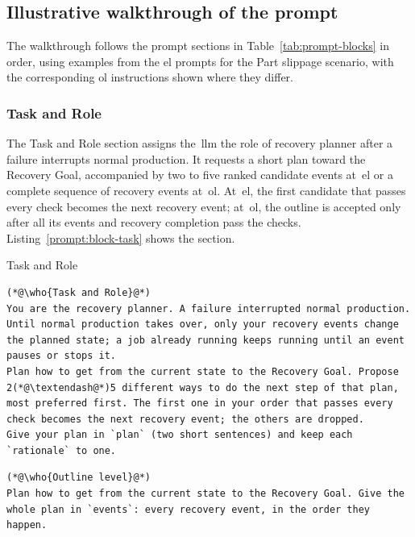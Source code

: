 
\FloatBarrier
\subsection{Illustrative walkthrough of the prompt}\label{sec:prompt-blocks}

The walkthrough follows the prompt sections in Table~\ref{tab:prompt-blocks} in order, using
examples from the \gls{el} prompts for the Part slippage scenario, with the corresponding \gls{ol} instructions shown where they differ.

\subsubsection{Task and Role}\label{sec:block-task}

The Task and Role section assigns the~\gls{llm} the role of recovery planner after a failure interrupts
normal production. It requests a short plan toward the Recovery Goal, accompanied by two to five
ranked candidate events at~\gls{el} or a complete sequence of recovery events at~\gls{ol}.
At~\gls{el}, the first candidate that passes every check becomes the next recovery event;
at~\gls{ol}, the outline is accepted only after all its events and recovery completion pass the checks.
Listing~\ref{prompt:block-task} shows the section.

\begin{recbox}{Task and Role}
\begin{lstlisting}
(*@\who{Task and Role}@*)
You are the recovery planner. A failure interrupted normal production. Until normal production takes over, only your recovery events change the planned state; a job already running keeps running until an event pauses or stops it.
Plan how to get from the current state to the Recovery Goal. Propose 2(*@\textendash@*)5 different ways to do the next step of that plan, most preferred first. The first one in your order that passes every check becomes the next recovery event; the others are dropped.
Give your plan in `plan` (two short sentences) and keep each `rationale` to one.
\end{lstlisting}

\vspace{3pt}
\begin{lstlisting}
(*@\who{Outline level}@*)
Plan how to get from the current state to the Recovery Goal. Give the whole plan in `events`: every recovery event, in the order they happen.
\end{lstlisting}
\end{recbox}

